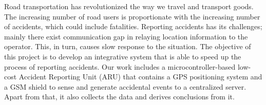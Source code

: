 
Road transportation has revolutionized the way we travel and transport goods. The increasing number of road users is proportionate with the increasing number of accidents, which could include fatalities. Reporting accidents has its challenges; mainly there exist communication gap in relaying location information to the operator. This, in turn, causes slow response to the situation. The objective of this project is to develop an integrative system that is able to speed up the process of reporting accidents. Our work includes a microcontroller-based low-cost Accident Reporting Unit (ARU) that contains a GPS positioning system and a GSM shield to sense and generate accidental events to a centralized server. Apart from that, it also collects the data and derives conclusions from it.



